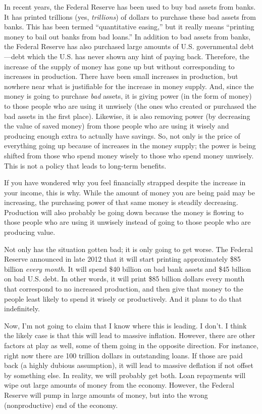In recent years, the Federal Reserve has been used to buy bad assets
from banks. It has printed trillions (yes, \textit{trillions}) of
dollars to purchase these bad assets from banks. This has been termed
“quantitative easing,” but it really means “printing money to bail out
banks from bad loans.”  In addition to bad assets from banks, the
Federal Reserve has also purchased large amounts of U.S. governmental
debt—debt which the U.S. has never shown any hint of paying back.
Therefore, the increase of the supply of money has gone up but without
corresponding to increases in production. There have been small
increases in production, but nowhere near what is justifiable for the
increase in money supply. And, since the money is going to purchase
\textit{bad} assets, it is giving power (in the form of money) to those
people who are using it unwisely (the ones who created or purchased the
bad assets in the first place).  Likewise, it is also removing power
(by decreasing the value of saved money) from those people who are
using it wisely and
producing enough extra to actually have
savings.  So, not
only is the price of everything going up because of increases in the
money supply; the power is being shifted from those who spend money
wisely to those who spend money unwisely. This is not a policy that
leads to long-term benefits.

If you have wondered why you feel financially strapped despite the
increase in your income, this is why. While the amount of money you are
being paid may be increasing, the purchasing power of that same money
is steadily decreasing. Production will also probably be going down
because the money is flowing to those people who are using it unwisely
instead of going to those people who are producing value.

Not only has the situation gotten bad; it is only going to get worse.
The Federal Reserve announced in late 2012 that it will start printing
approximately \$85 billion \textit{every month}. It will spend \$40
billion on bad bank assets and \$45 billion on bad U.S. debt. In other
words, it will print \$85 billion dollars every month that correspond
to no increased production, and then give that money to the people
least likely to spend it wisely or productively. And it plans to do
that indefinitely.

Now, I’m not going to claim that I know where this is leading. I don’t.
I think the likely case is that this will lead to massive inflation. 
However, there are other factors at play as well, some of them going in
the opposite direction.  For instance, right now there are 100 trillion
dollars in outstanding loans. If those are paid back (a highly dubious
assumption), it will lead to massive deflation if not offset by
something else.  In reality, we will probably get both. Loan repayments
will wipe out large amounts of money from the economy.  However, the
Federal Reserve will pump in large amounts of money, but into the wrong
(nonproductive) end of the economy.  

